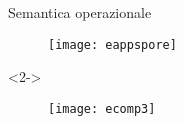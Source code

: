 \begin{frame}{Semantica operazionale}
	\begin{figure}
		\centering\texttt{[image: eappspore]}
	\end{figure}
	
	\begin{onlyenv}<2->
		\begin{figure}
			\centering\texttt{[image: ecomp3]}
		\end{figure}
	\end{onlyenv}
\end{frame}